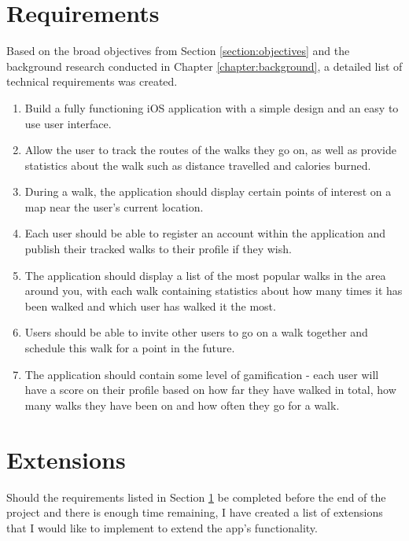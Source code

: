 \section{Requirements} \label{section:requirements}

Based on the broad objectives from Section \ref{section:objectives} and the background research conducted in Chapter \ref{chapter:background}, a detailed list of technical requirements was created.


\begin{enumerate}[label=\textbf{Req \arabic*}]
    \item Build a fully functioning iOS application with a simple design and an easy to use user interface.
    \item Allow the user to track the routes of the walks they go on, as well as provide statistics about the walk such as distance travelled and calories burned.
    \item During a walk, the application should display certain points of interest on a map near the user's current location.
    \item Each user should be able to register an account within the application and publish their tracked walks to their profile if they wish.
    \item The application should display a list of the most popular walks in the area around you, with each walk containing statistics about how many times it has been walked and which user has walked it the most.
    \item Users should be able to invite other users to go on a walk together and schedule this walk for a point in the future.
    \item The application should contain some level of gamification - each user will have a score on their profile based on how far they have walked in total, how many walks they have been on and how often they go for a walk.
\end{enumerate}

\section{Extensions}

Should the requirements listed in Section \ref{section:requirements} be completed before the end of the project and there is enough time remaining, I have created a list of extensions that I would like to implement to extend the app's functionality.

